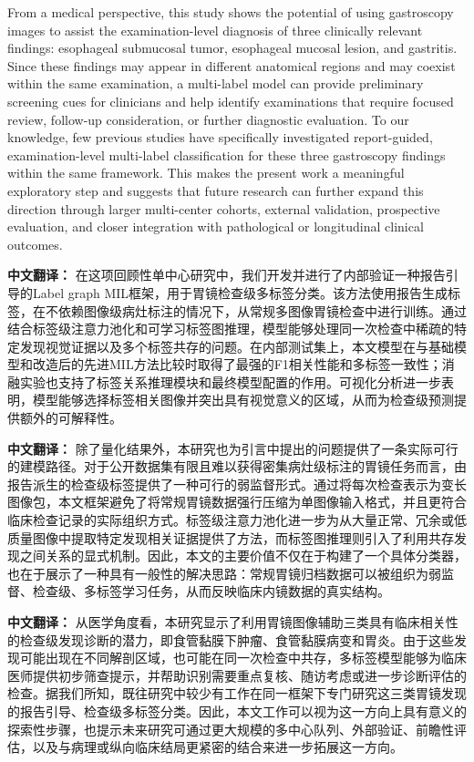 \documentclass[Afour,sagev,times]{sagej}
\begin{document}
From a medical perspective, this study shows the potential of using gastroscopy images to assist the examination-level diagnosis of three clinically relevant findings: esophageal submucosal tumor, esophageal mucosal lesion, and gastritis. Since these findings may appear in different anatomical regions and may coexist within the same examination, a multi-label model can provide preliminary screening cues for clinicians and help identify examinations that require focused review, follow-up consideration, or further diagnostic evaluation. To our knowledge, few previous studies have specifically investigated report-guided, examination-level multi-label classification for these three gastroscopy findings within the same framework. This makes the present work a meaningful exploratory step and suggests that future research can further expand this direction through larger multi-center cohorts, external validation, prospective evaluation, and closer integration with pathological or longitudinal clinical outcomes.

\textbf{中文翻译：} 在这项回顾性单中心研究中，我们开发并进行了内部验证一种报告引导的Label graph MIL框架，用于胃镜检查级多标签分类。该方法使用报告生成标签，在不依赖图像级病灶标注的情况下，从常规多图像胃镜检查中进行训练。通过结合标签级注意力池化和可学习标签图推理，模型能够处理同一次检查中稀疏的特定发现视觉证据以及多个标签共存的问题。在内部测试集上，本文模型在与基础模型和改造后的先进MIL方法比较时取得了最强的F1相关性能和多标签一致性；消融实验也支持了标签关系推理模块和最终模型配置的作用。可视化分析进一步表明，模型能够选择标签相关图像并突出具有视觉意义的区域，从而为检查级预测提供额外的可解释性。

\textbf{中文翻译：} 除了量化结果外，本研究也为引言中提出的问题提供了一条实际可行的建模路径。对于公开数据集有限且难以获得密集病灶级标注的胃镜任务而言，由报告派生的检查级标签提供了一种可行的弱监督形式。通过将每次检查表示为变长图像包，本文框架避免了将常规胃镜数据强行压缩为单图像输入格式，并且更符合临床检查记录的实际组织方式。标签级注意力池化进一步为从大量正常、冗余或低质量图像中提取特定发现相关证据提供了方法，而标签图推理则引入了利用共存发现之间关系的显式机制。因此，本文的主要价值不仅在于构建了一个具体分类器，也在于展示了一种具有一般性的解决思路：常规胃镜归档数据可以被组织为弱监督、检查级、多标签学习任务，从而反映临床内镜数据的真实结构。

\textbf{中文翻译：} 从医学角度看，本研究显示了利用胃镜图像辅助三类具有临床相关性的检查级发现诊断的潜力，即食管黏膜下肿瘤、食管黏膜病变和胃炎。由于这些发现可能出现在不同解剖区域，也可能在同一次检查中共存，多标签模型能够为临床医师提供初步筛查提示，并帮助识别需要重点复核、随访考虑或进一步诊断评估的检查。据我们所知，既往研究中较少有工作在同一框架下专门研究这三类胃镜发现的报告引导、检查级多标签分类。因此，本文工作可以视为这一方向上具有意义的探索性步骤，也提示未来研究可通过更大规模的多中心队列、外部验证、前瞻性评估，以及与病理或纵向临床结局更紧密的结合来进一步拓展这一方向。
\end{document}
